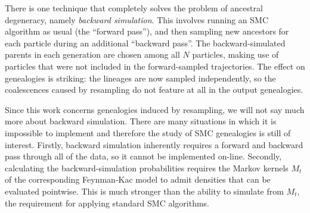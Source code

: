 There is one technique that completely solves the problem of ancestral degeneracy, namely \emph{backward simulation}\seb{[citation]}. This involves running an SMC algorithm as usual (the ``forward pass''), and then sampling new ancestors for each particle during an additional ``backward pass''. 
The backward-simulated parents in each generation are chosen among all $N$ particles, making use of particles that were not included in the forward-sampled trajectories.
The effect on genealogies is striking: the lineages are now sampled independently, so the coalescences caused by resampling do not feature at all in the output genealogies.

Since this work concerns genealogies induced by resampling, we will not say much more about backward simulation. There are many situations in which it is impossible to implement and therefore the study of SMC genealogies is still of interest. 
Firstly, backward simulation inherently requires a forward and backward pass through all of the data, so it cannot be implemented on-line. 
Secondly, calculating the backward-simulation probabilities requires the Markov kernels $M_t$ of the corresponding Feynman-Kac model to admit densities that can be evaluated pointwise. This is much stronger than the ability to simulate from $M_t$, the requirement for applying standard SMC algorithms.




